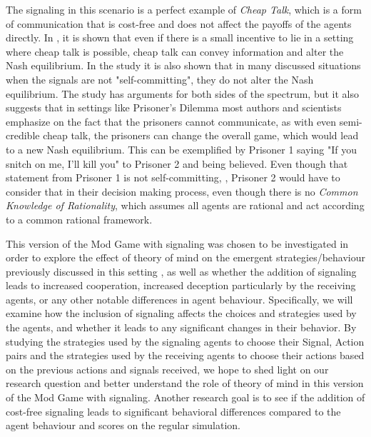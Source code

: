 The signaling in this scenario is a perfect example of \textit{Cheap Talk}, which is a form of communication that is cost-free and does not affect the payoffs of the agents directly. In \cite{farrell1996cheap}, it is shown that even if there is a small incentive to lie in a setting where cheap talk is possible, cheap talk can convey information and alter the Nash equilibrium. In the study it is also shown that in many discussed situations when the signals are not "self-committing", they do not alter the Nash equilibrium. The study has arguments for both sides of the spectrum, but it also suggests that in settings like Prisoner's Dilemma \citep{kuhn1997prisoner} most authors and scientists emphasize on the fact that the prisoners cannot communicate, as with even semi-credible cheap talk, the prisoners can change the overall game, which would lead to a new Nash equilibrium. This can be exemplified by Prisoner 1 saying "If you snitch on me, I'll kill you" to Prisoner 2 and being believed. Even though that statement from Prisoner 1 is not self-committing, \citep{osborne1994course}, Prisoner 2 would have to consider that in their decision making process, even though there is no \textit{Common Knowledge of Rationality}, which assumes all agents are rational and act according to a common rational framework.

This version of the Mod Game with signaling was chosen to be investigated in order to explore the effect of theory of mind on the emergent strategies/behaviour previously discussed in this setting \citep{veltman2019training}, as well as whether the addition of signaling leads to increased cooperation, increased deception particularly by the receiving agents, or any other notable differences in agent behaviour. Specifically, we will examine how the inclusion of signaling affects the choices and strategies used by the agents, and whether it leads to any significant changes in their behavior. By studying the strategies used by the signaling agents to choose their {Signal, Action} pairs and the strategies used by the receiving agents to choose their actions based on the previous actions and signals received, we hope to shed light on our research question and better understand the role of theory of mind in this version of the Mod Game with signaling. Another research goal is to see if the addition of cost-free signaling leads to significant behavioral differences compared to the agent behaviour and scores on the regular simulation.  